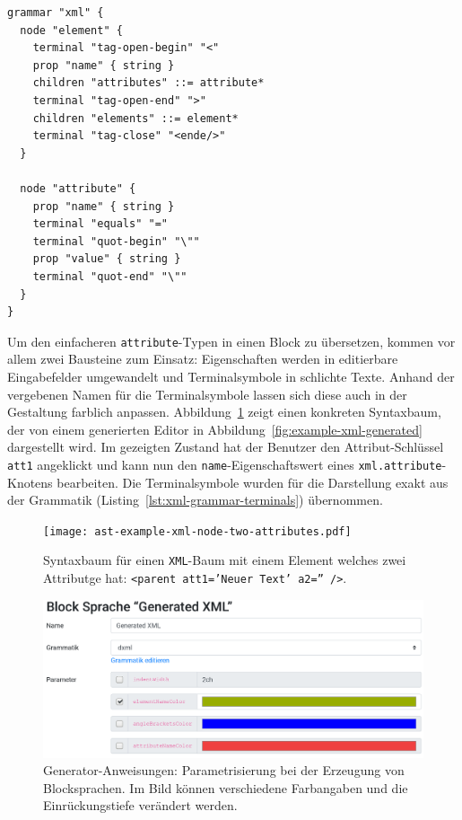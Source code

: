 \documentclass[paper=a4,fontsize=11pt,parskip=half]{scrartcl}
\begin{document}
\begin{lstlisting}[float=h, label={lst:xml-grammar-terminals},caption={Terminalsymbole für Attribute und Elemente in \texttt{XML} },captionpos=b,language={Grammar}]
grammar "xml" {
  node "element" {
    terminal "tag-open-begin" "<"
    prop "name" { string }
    children "attributes" ::= attribute*
    terminal "tag-open-end" ">"
    children "elements" ::= element*
    terminal "tag-close" "<ende/>"
  }

  node "attribute" {
    prop "name" { string }
    terminal "equals" "="
    terminal "quot-begin" "\""
    prop "value" { string }
    terminal "quot-end" "\""
  }
}
\end{lstlisting}

Um den einfacheren \texttt{attribute}-Typen in einen Block zu übersetzen, kommen vor allem zwei Bausteine zum Einsatz: Eigenschaften werden in editierbare Eingabefelder umgewandelt und Terminalsymbole in schlichte Texte. Anhand der vergebenen Namen für die Terminalsymbole lassen sich diese auch in der Gestaltung farblich anpassen. Abbildung~\ref{fig:ast-example-xml-node-two-attributes} zeigt einen konkreten Syntaxbaum, der von einem generierten Editor in Abbildung~\ref{fig:example-xml-generated} dargestellt wird. Im gezeigten Zustand hat der Benutzer den Attribut-Schlüssel \texttt{att1} angeklickt und kann nun den \texttt{name}-Eigenschaftswert eines \texttt{xml.attribute}-Knotens bearbeiten. Die Terminalsymbole wurden für die Darstellung exakt aus der Grammatik (Listing~\ref{lst:xml-grammar-terminals}) übernommen.

\begin{figure}[p]
  \centering\texttt{[image: ast-example-xml-node-two-attributes.pdf]}
  \caption{Syntaxbaum für einen \texttt{XML}-Baum mit einem Element welches zwei Attributge hat: \texttt{<parent att1='Neuer Text' a2='' />}.}
  \label{fig:ast-example-xml-node-two-attributes}
\end{figure}

\begin{figure}[p]
  \centering\includegraphics[width=\linewidth]{screenshot-generation-parameters.png}
  \caption{Generator-Anweisungen: Parametrisierung bei der Erzeugung von Blocksprachen. Im Bild können verschiedene Farbangaben und die Einrückungstiefe verändert werden.}
  \label{fig:block-lang-generation-parameters}
\end{figure}
\end{document}
